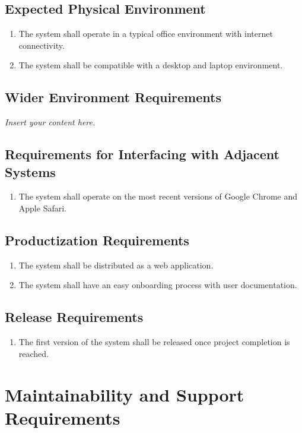 \documentclass[12pt]{article}
\newcommand{\lips}{\textit{Insert your content here.}}
\begin{document}
\subsection{Expected Physical Environment}
\begin{enumerate}
  \item The system shall operate in a typical office environment with internet connectivity.
  \item The system shall be compatible with a desktop and laptop environment.
\end{enumerate}

\subsection{Wider Environment Requirements}
\lips
\subsection{Requirements for Interfacing with Adjacent Systems}
\begin{enumerate}
  \item The system shall operate on the most recent versions of Google Chrome and Apple Safari.
\end{enumerate}

\subsection{Productization Requirements}
\begin{enumerate}
  \item The system shall be distributed as a web application.
  \item The system shall have an easy onboarding process with user documentation.
\end{enumerate}

\subsection{Release Requirements}
\begin{enumerate}
  \item The first version of the system shall be released once project completion is reached.
\end{enumerate}

\section{Maintainability and Support Requirements}
\end{document}
